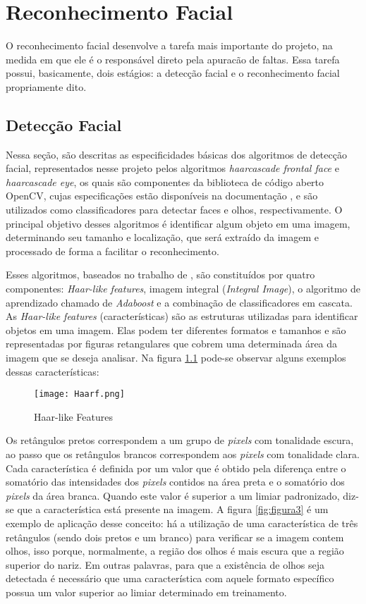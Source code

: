 \chapter{Reconhecimento Facial}
\noindent
O reconhecimento facial desenvolve a tarefa mais importante do projeto, na medida em que ele é o responsável direto pela apuracão de faltas. Essa tarefa possui, basicamente, dois estágios: a detecção facial e o reconhecimento facial propriamente dito. 
\section{Detecção Facial}
Nessa seção, são descritas as especificidades básicas dos algoritmos de detecção facial, representados nesse projeto pelos algoritmos \textit{haarcascade frontal face} e \textit{haarcascade eye}, os quais são componentes da biblioteca de código aberto OpenCV, cujas especificações estão disponíveis na documentação \citep{open2018}, e são utilizados como classificadores para detectar faces e olhos, respectivamente. O principal objetivo desses algoritmos é identificar algum objeto em uma imagem, determinando seu tamanho e localização, que será extraído da imagem e processado de forma a facilitar o reconhecimento.

Esses algoritmos, baseados no trabalho de \citep{Viola2001}, são constituídos por quatro componentes: \textit{Haar-like features}, imagem integral (\textit{Integral Image}), o algoritmo de aprendizado chamado de \textit{Adaboost} e a combinação de classificadores em cascata. As \textit{Haar-like features} (características) são as estruturas utilizadas para identificar objetos em uma imagem. Elas podem ter diferentes formatos e tamanhos e são representadas por figuras retangulares que cobrem uma determinada área da imagem que se deseja analisar. Na figura \ref{fig:figura2} pode-se observar alguns exemplos dessas características:

\begin{figure}[!ht]
	\centering
	\texttt{[image: Haarf.png]}   
	\caption{Haar-like Features}
	\label{fig:figura2}
\end{figure}

Os retângulos pretos correspondem a um grupo de \textit{pixels} com tonalidade escura, ao passo que os retângulos brancos correspondem aos \textit{pixels} com tonalidade clara. Cada característica é definida por um valor que é obtido pela diferença entre o somatório das intensidades dos \textit{pixels} contidos na área preta e o somatório dos \textit{pixels} da área branca. Quando este valor é superior a um limiar padronizado, diz-se que a característica está presente na imagem. A figura \ref{fig:figura3} é um exemplo de aplicação desse conceito: há a utilização de uma característica de três retângulos (sendo dois pretos e um branco) para verificar se a imagem contem olhos, isso porque, normalmente, a região dos olhos é mais escura que a região superior do nariz. Em outras palavras, para que a existência de olhos seja detectada é necessário que uma característica com aquele formato específico possua um valor superior ao limiar determinado em treinamento.

